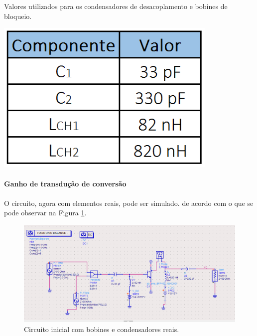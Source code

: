 \documentclass[11pt]{article}
\numberwithin{equation}{section}
\begin{document}
\begin{table}[h]
	\centering
	\caption{Valores utilizados para os condensadores de desacoplamento e bobines de bloqueio.}
	\vspace{-1.5mm}
	\includegraphics[keepaspectratio=true, scale=0.35]{teoricas/componentes}
	\label{tab:cap_ind}
\end{table}


\paragraph{Ganho de transdução de conversão} \hspace{0pt} 

O circuito, agora com elementos reais, pode ser simulado. de acordo com o que se pode observar na Figura \ref{fig:Circuito_0}.

\begin{figure}[h]
\centering
\includegraphics[keepaspectratio=true, scale=0.45]{exps/Circuito_2c}
\vspace{-0.5em}
\caption{Circuito inicial com bobines e condensadores reais.}
\vspace{-0.8em}
\label{fig:Circuito_0}
\end{figure}
\end{document}
